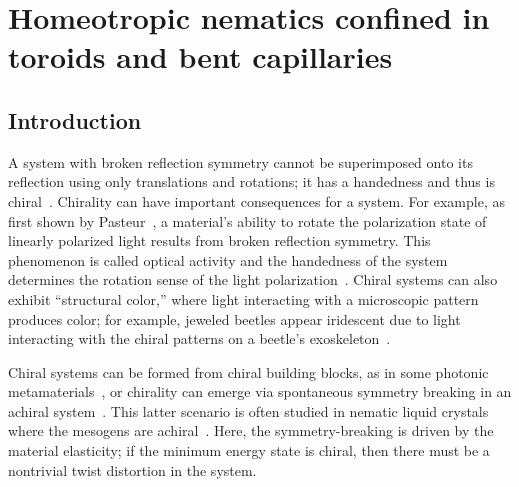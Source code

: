 \chapter{Homeotropic nematics confined in toroids and bent capillaries}

\section{Introduction}
A system with broken reflection symmetry cannot be superimposed onto its reflection using only translations and rotations; it has a handedness and thus is chiral~\cite{RN175}.
Chirality can have important consequences for a system.
For example, as first shown by Pasteur~\cite{RN291}, a material's ability to rotate the polarization state of linearly polarized light results from broken reflection symmetry.
This phenomenon is called optical activity and the handedness of the system determines the rotation sense of the light polarization~\cite{RN291}.
Chiral systems can also exhibit ``structural color,'' where light interacting with a microscopic pattern produces color; for example, jeweled beetles appear iridescent due to light interacting with the chiral patterns on a beetle's exoskeleton~\cite{RN308,RN307}.

Chiral systems can be formed from chiral building blocks, as in some photonic metamaterials~\cite{RN304,metameterial}, or chirality can emerge via spontaneous symmetry breaking in an achiral system~\cite{RN294}.
This latter scenario is often studied in nematic liquid crystals where the mesogens are achiral~\cite{RN297,RN296,RN298,RN295,RN299,RN193,RN24,RN192,RN191,RN293,RN302}.
Here, the symmetry-breaking is driven by the material elasticity; if the minimum energy state is chiral, then there must be a nontrivial twist distortion in the system.

